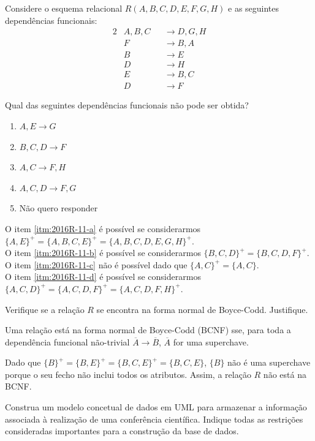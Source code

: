 \documentclass[type=recurso, year=2015/16]{bdad_exam}
\begin{document}
{\newpage
{}
Considere o esquema relacional $R(A,B,C,D,E,F,G,H)$ e as seguintes dependências funcionais:
\begin{alignat*}{2}
    & A, B, C && \rightarrow D, G, H \\
    & F       && \rightarrow B, A    \\
    & B       && \rightarrow E       \\
    & D       && \rightarrow H       \\
    & E       && \rightarrow B, C    \\
    & D       && \rightarrow F
\end{alignat*}

Qual das seguintes dependências funcionais não pode ser obtida?
\begin{enumerate}[label=\alph*.]\itemsep0em
    \item \label{itm:2016R-11-a} $A, E \rightarrow G$
    \item \label{itm:2016R-11-b} $B, C, D \rightarrow F$
    \item \label{itm:2016R-11-c} $A,C \rightarrow F,H$
    \item \label{itm:2016R-11-d} $A,C,D \rightarrow F,G$
    \item \label{itm:2016R-11-e} Não quero responder
\end{enumerate}
O item \ref{itm:2016R-11-a} é possível se considerarmos $\{A,E\}^+ = \{A,B,C,E\}^+ = \{A,B,C,D,E,G,H\}^+$.\\
O item \ref{itm:2016R-11-b} é possível se considerarmos $\{B,C,D\}^+ = \{B,C,D,F\}^+$.\\
O item \ref{itm:2016R-11-c} não é possível dado que $\{A,C\}^+ = \{A,C\}$.\\
O item \ref{itm:2016R-11-d} é possível se considerarmos $\{A,C,D\}^+ = \{A,C,D,F\}^+ = \{A,C,D,F,H\}^+$.

Verifique se a relação $R$ se encontra na forma normal de Boyce-Codd. Justifique.

\ansseparator

Uma relação está na forma normal de Boyce-Codd (BCNF) sse, para toda a dependência funcional não-trivial $\overline{A} \rightarrow \overline{B}$, $\overline{A}$ for uma superchave.

Dado que $\{B\}^+ = \{B,E\}^+ = \{B,C,E\}^+ = \{B,C,E\}$, $\{B\}$ não é uma superchave porque o seu fecho não inclui todos os atributos. Assim, a relação $R$ não está na BCNF.

\newpage
{}
Construa um modelo concetual de dados em UML para armazenar a informação associada à realização de uma conferência científica. Indique todas as restrições consideradas importantes para a construção da base de dados.

}
\end{document}
